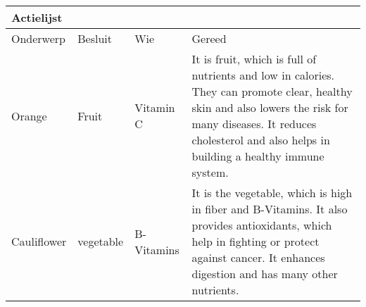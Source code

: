 \begin{center}  
	\begin{tabular}{ | l | l | l | p{5cm} |} %
		\hline  
		\multicolumn{4}{|l|}{Actielijst} \\ \hline  
		Onderwerp & Besluit & Wie &Gereed \\ \hline  
		Orange & Fruit & Vitamin C & It is fruit, which is full of nutrients and low in calories. They can promote clear, healthy skin and also lowers the risk for many diseases. It reduces cholesterol and also helps in building a healthy immune system.\\ \hline  
		
		Cauliflower & vegetable & B-Vitamins & It is the vegetable, which is high in fiber and B-Vitamins. It also provides antioxidants, which help in fighting or protect against cancer. It enhances digestion and has many other nutrients.\\ \hline  
		
	\end{tabular}  
\end{center}  


